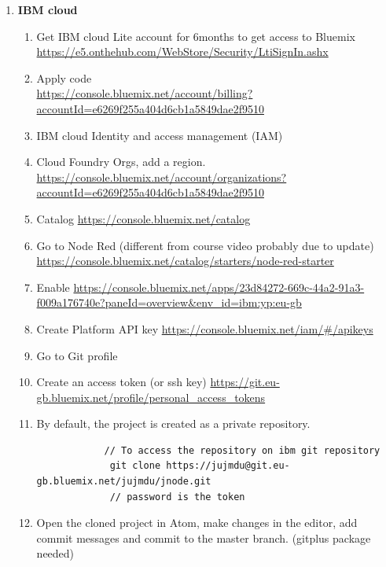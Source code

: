 \documentclass[11pt, twoside]{article}   	%
\begin{document}
\begin{enumerate}
\item \textbf{IBM cloud}     
   \begin{enumerate}
       \item Get IBM cloud Lite account for 6months to get access to Bluemix 
       \\\url{https://e5.onthehub.com/WebStore/Security/LtiSignIn.ashx}
       \item Apply code 
       \\\url{https://console.bluemix.net/account/billing?accountId=e6269f255a404d6cb1a5849dae2f9510}
        \item IBM cloud Identity and access management \big(IAM\big)
        \item Cloud Foundry Orgs, add a region. \url{https://console.bluemix.net/account/organizations?accountId=e6269f255a404d6cb1a5849dae2f9510}
       \item Catalog \url{https://console.bluemix.net/catalog}
        \item Go to Node Red \big(different from course video probably due to update) \url{https://console.bluemix.net/catalog/starters/node-red-starter}
        \item Enable \url{https://console.bluemix.net/apps/23d84272-669c-44a2-91a3-f009a176740e?paneId=overview&env_id=ibm:yp:eu-gb}
        \item Create Platform  API key \url{https://console.bluemix.net/iam/#/apikeys}      
        \item Go to Git profile %
        \item Create an access token \big(or ssh key\big) \url{https://git.eu-gb.bluemix.net/profile/personal_access_tokens}
        \item By default, the project is created as a private repository.  
        \begin{lstlisting}
            // To access the repository on ibm git repository 
             git clone https://jujmdu@git.eu-gb.bluemix.net/jujmdu/jnode.git
             // password is the token
             \end{lstlisting}
        \item Open the cloned project in Atom, make changes in the editor, add commit messages and commit to the master branch. \big(git\-plus package needed\big)
              

\end{enumerate}
\end{enumerate}
\end{document}
